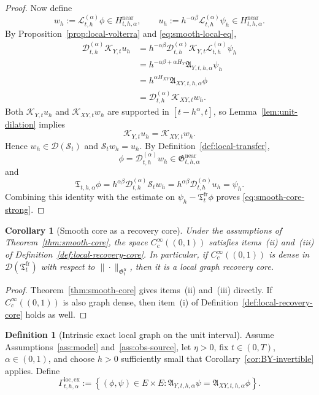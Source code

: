 \documentclass[11pt,a4paper]{amsart}
\theoremstyle{plain}
\newtheorem{corollary}[theorem]{Corollary}
\theoremstyle{definition}
\newtheorem{definition}[theorem]{Definition}
\theoremstyle{remark}
\begin{document}
\begin{proof}
Now define
\[
w_h:=\mathcal L_{t,h}^{(\alpha)}\phi\in H_{t,h,\alpha}^{\mathrm{near}},
\qquad
u_h:=h^{-\alpha\beta}\mathcal L_{t,h}^{(\alpha)}\psi_h\in H_{t,h,\alpha}^{\mathrm{near}}.
\]
By Proposition~\ref{prop:local-volterra} and \eqref{eq:smooth-local-eq},
\begin{align*}
\mathcal D_{t,h}^{(\alpha)}\mathcal K_{Y,t}u_h
&=
h^{-\alpha\beta}\mathcal D_{t,h}^{(\alpha)}
\mathcal K_{Y,t}\mathcal L_{t,h}^{(\alpha)}\psi_h \\
&=
h^{-\alpha\beta+\alpha H_Y}\mathfrak A_{Y,t,h,\alpha}\psi_h \\
&=
h^{\alpha H_{XY}}\mathfrak A_{XY,t,h,\alpha}\phi \\
&=
\mathcal D_{t,h}^{(\alpha)}\mathcal K_{XY,t}w_h.
\end{align*}
Both \(\mathcal K_{Y,t}u_h\) and \(\mathcal K_{XY,t}w_h\) are supported in
\([t-h^\alpha,t]\), so Lemma~\ref{lem:unit-dilation} implies
\[
\mathcal K_{Y,t}u_h=\mathcal K_{XY,t}w_h.
\]
Hence \(w_h\in\mathcal D(\mathcal S_t)\) and \(\mathcal S_t w_h=u_h\). By
Definition~\ref{def:local-transfer},
\[
\phi=\mathcal D_{t,h}^{(\alpha)}w_h\in \mathfrak G_{t,h,\alpha}^{\mathrm{near}}
\]
and
\[
\mathfrak T_{t,h,\alpha}\phi
=
h^{\alpha\beta}\mathcal D_{t,h}^{(\alpha)}\mathcal S_t w_h
=
h^{\alpha\beta}\mathcal D_{t,h}^{(\alpha)}u_h
=
\psi_h.
\]
Combining this identity with the estimate on \(\psi_h-\mathfrak T_t^{\mathrm{fr}}\phi\) proves
\eqref{eq:smooth-core-strong}.
\end{proof}

\begin{corollary}[Smooth core as a recovery core]
\label{cor:smooth-recovery}
Under the assumptions of Theorem~\ref{thm:smooth-core}, the space \(C_c^\infty((0,1))\)
satisfies items~(ii) and~(iii) of Definition~\ref{def:local-recovery-core}. In particular, if
\(C_c^\infty((0,1))\) is dense in \(\mathcal D(\mathfrak T_t^{\mathrm{fr}})\) with respect to
\(\|\cdot\|_{\mathfrak G_t^{\mathrm{fr}}}\), then it is a local graph recovery core.
\end{corollary}

\begin{proof}
Theorem~\ref{thm:smooth-core} gives items~(ii) and~(iii) directly. If
\(C_c^\infty((0,1))\) is also graph dense, then item~(i) of
Definition~\ref{def:local-recovery-core} holds as well.
\end{proof}

\begin{definition}[Intrinsic exact local graph on the unit interval]
\label{def:local-exact-graph}
Assume Assumptions~\ref{ass:model} and~\ref{ass:obs-source}, let \(\eta>0\), fix
\(t\in(0,T)\), \(\alpha\in(0,1)\), and choose \(h>0\) sufficiently small that
Corollary~\ref{cor:BY-invertible} applies. Define
\[
\Gamma_{t,h,\alpha}^{\mathrm{loc,ex}}
:=
\left\{
(\phi,\psi)\in E\times E:
\mathfrak A_{Y,t,h,\alpha}\psi
=
\mathfrak A_{XY,t,h,\alpha}\phi
\right\}.
\]
\end{definition}
\end{document}
